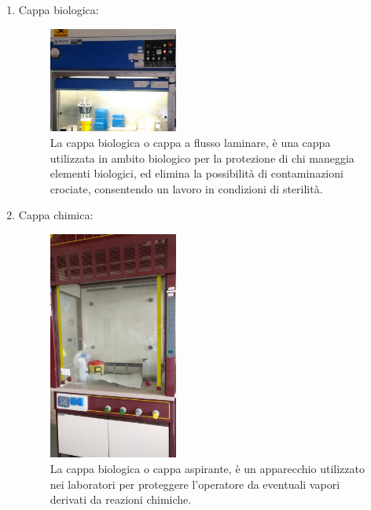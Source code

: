 \documentclass{article}
\begin{document}
\begin{enumerate}
		\item Cappa biologica:

		\begin{figure}[H]

			\includegraphics[width=0.4\textwidth]{./immagini/cappa_biologica.jpg}
			\caption{La cappa biologica o cappa a flusso laminare, è una cappa utilizzata in ambito biologico per la protezione di chi maneggia elementi
			biologici, ed elimina la possibilità di contaminazioni crociate, consentendo un lavoro in condizioni di sterilità.}
			\label{cappa_biologica}

		\end{figure}

		\vspace{0.5cm}


		\item Cappa chimica:

		\begin{figure}[H]

			\includegraphics[width=0.4\textwidth]{./immagini/cappa_chimica.jpg}
			\caption{La cappa biologica o cappa aspirante, è un apparecchio utilizzato nei laboratori per proteggere l'operatore da eventuali vapori derivati da reazioni chimiche.}
			\label{cappa_chimica}


\end{figure}
\end{enumerate}
\end{document}

